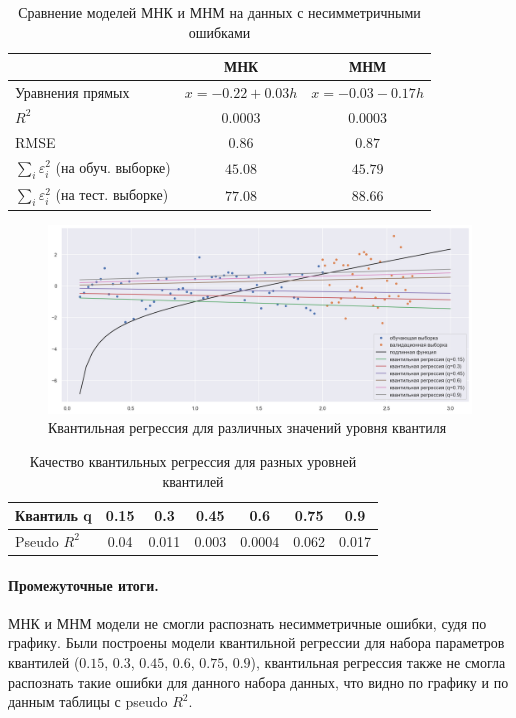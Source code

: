 \documentclass[a4paper,12pt]{article}
\begin{document}
\begin{table}[H]
    \centering
    \begin{tabular}{|l|c|c|}
        \hline
        & МНК & МНМ \\ \hline
        Уравнения прямых & $x = -0.22 + 0.03 h$ & $x = -0.03 - 0.17 h$ \\ \hline
        $R^2$ & $0.0003$ & $0.0003$ \\ \hline
        RMSE & $0.86$ & $0.87$ \\ \hline
        $\sum\limits_i \varepsilon_i^2$ (на обуч. выборке) & $45.08$ & $45.79$ \\ \hline
        $\sum\limits_i \varepsilon_i^2$ (на тест. выборке) & $77.08$ & $88.66$ \\ \hline
    \end{tabular}
    \caption{Сравнение моделей МНК и МНМ на данных с несимметричными ошибками}
\end{table}

\begin{figure}[H]
    \centering
    \includegraphics[width=\linewidth]{src/img/квантильная_регрессия.png}
    \caption{Квантильная регрессия для различных значений уровня квантиля}
\end{figure}

\begin{table}[H]
    \centering
    \begin{tabular}{|l|c|c|c|c|c|c|}
        \hline
        Квантиль q & 0.15 & 0.3 & 0.45 & 0.6 & 0.75 & 0.9 \\ \hline
        Pseudo $R^2$ & 0.04 & 0.011 & 0.003 & 0.0004 & 0.062 & 0.017 \\ \hline
    \end{tabular}
    \caption{Качество квантильных регрессия для разных уровней квантилей}
\end{table}

\paragraph{Промежуточные итоги.\\}
МНК и МНМ модели не смогли распознать несимметричные ошибки, судя по графику. Были построены модели квантильной регрессии для набора параметров квантилей ($0.15$, $0.3$, $0.45$, $0.6$, $0.75$, $0.9$), квантильная регрессия также не смогла распознать такие ошибки для данного набора данных, что видно по графику и по данным таблицы с pseudo $R^2$.
\end{document}

